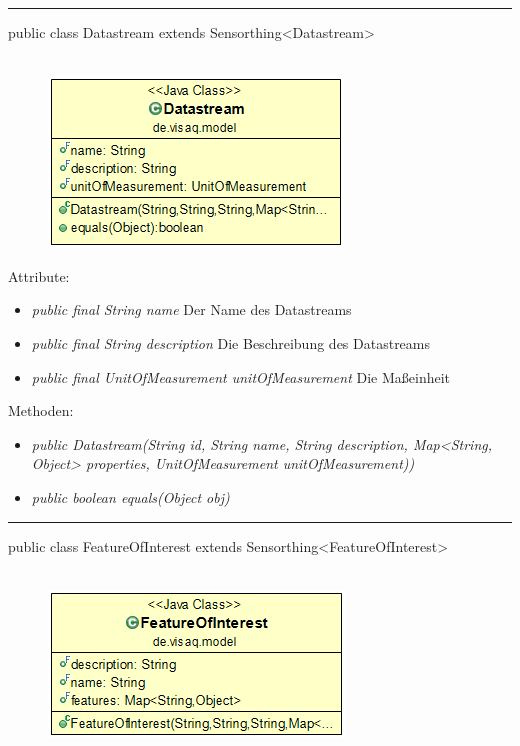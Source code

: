 \rule{\textwidth}{0.4pt}
public class Datastream extends Sensorthing<Datastream>
\\\\
\begin{minipage}{0.3\textwidth}
	\begin{figure}[H]
		\includegraphics[scale = 0.5
		]{media/frontend/model/DatastreamClass.png}
	\end{figure}
\end{minipage} \hfill
\begin{minipage}{0.6\textwidth}
\end{minipage}

Attribute:
\begin{itemize}
	\item \emph{public final String name} Der Name des Datastreams
	\item \emph{public final String description} Die Beschreibung des Datastreams
	\item \emph{public final UnitOfMeasurement unitOfMeasurement} Die Maßeinheit
\end{itemize}
Methoden:
\begin{itemize}
	\item \emph{public Datastream(String id, String name, String description, Map<String, Object> properties, UnitOfMeasurement unitOfMeasurement))} 
	\item \emph{public boolean equals(Object obj)} 
\end{itemize}

\rule{\textwidth}{0.4pt}
public class FeatureOfInterest extends Sensorthing<FeatureOfInterest>
\\\\
\begin{minipage}{0.3\textwidth}
	\begin{figure}[H]
		\includegraphics[scale = 0.5
		]{media/frontend/model/FeatureOfInterestClass.png}
	\end{figure}
\end{minipage} \hfill
\begin{minipage}{0.6\textwidth}
\end{minipage}

